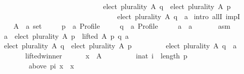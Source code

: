 \begin{isabellebody}
\ \ \ \ \ \ \ \ \ \ \ \ \ \ \ \ \ \ \ \ \ \ \ \ \ \ \ \ \ \ \ \ {\isacharparenleft}{\kern0pt}elect\ plurality\ A\ q\ {\isacharequal}{\kern0pt}\ elect\ plurality\ A\ p\ {\isasymor}\isanewline
\ \ \ \ \ \ \ \ \ \ \ \ \ \ \ \ \ \ \ \ \ \ \ \ \ \ \ \ \ \ \ \ \ \ \ \ elect\ plurality\ A\ q\ {\isacharequal}{\kern0pt}\ {\isacharbraceleft}{\kern0pt}a{\isacharbraceright}{\kern0pt}{\isacharparenright}{\kern0pt}{\isachardoublequoteclose}\isanewline
%
\isadelimproof
%
\endisadelimproof
%
\isatagproof
{}\isamarkupfalse%
\ {\isacharparenleft}{\kern0pt}intro\ allI\ impI{\isacharparenright}{\kern0pt}\isanewline
\ \ \isamarkupfalse%
\isanewline
\ \ \ \ A\ {\isacharcolon}{\kern0pt}{\isacharcolon}{\kern0pt}\ {\isachardoublequoteopen}{\isacharprime}{\kern0pt}a\ set{\isachardoublequoteclose}\ \isanewline
\ \ \ \ p\ {\isacharcolon}{\kern0pt}{\isacharcolon}{\kern0pt}\ {\isachardoublequoteopen}{\isacharprime}{\kern0pt}a\ Profile{\isachardoublequoteclose}\ \isanewline
\ \ \ \ q\ {\isacharcolon}{\kern0pt}{\isacharcolon}{\kern0pt}\ {\isachardoublequoteopen}{\isacharprime}{\kern0pt}a\ Profile{\isachardoublequoteclose}\ \isanewline
\ \ \ \ a\ {\isacharcolon}{\kern0pt}{\isacharcolon}{\kern0pt}\ {\isachardoublequoteopen}{\isacharprime}{\kern0pt}a{\isachardoublequoteclose}\isanewline
\ \ \isamarkupfalse%
\isanewline
\ \ \ \ asm{}{\isacharcolon}{\kern0pt}\isanewline
\ \ \ \ {\isachardoublequoteopen}a\ {\isasymin}\ elect\ plurality\ A\ p\ {\isasymand}\ lifted\ A\ p\ q\ a{\isachardoublequoteclose}\isanewline
\ \ \isamarkupfalse%
\isanewline
\ \ \ \ {\isachardoublequoteopen}elect\ plurality\ A\ q\ {\isacharequal}{\kern0pt}\ elect\ plurality\ A\ p\ {\isasymor}\isanewline
\ \ \ \ \ \ \ \ elect\ plurality\ A\ q\ {\isacharequal}{\kern0pt}\ {\isacharbraceleft}{\kern0pt}a{\isacharbraceright}{\kern0pt}{\isachardoublequoteclose}\isanewline
\ \ \isamarkupfalse%
\ {\isacharminus}{\kern0pt}\isanewline
\ \ \ \ \isamarkupfalse%
\ lifted{\isacharunderscore}{\kern0pt}winner{\isacharcolon}{\kern0pt}\isanewline
\ \ \ \ \ \ {\isachardoublequoteopen}{\isasymforall}x\ {\isasymin}\ A{\isachardot}{\kern0pt}\isanewline
\ \ \ \ \ \ \ \ \ {\isasymforall}i{\isacharcolon}{\kern0pt}{\isacharcolon}{\kern0pt}nat{\isachardot}{\kern0pt}\ i\ {\isacharless}{\kern0pt}\ length\ p\ {\isasymlongrightarrow}\isanewline
\ \ \ \ \ \ \ \ \ \ \ {\isacharparenleft}{\kern0pt}above\ {\isacharparenleft}{\kern0pt}p{\isacharbang}{\kern0pt}i{\isacharparenright}{\kern0pt}\ x\ {\isacharequal}{\kern0pt}\ {\isacharbraceleft}{\kern0pt}x{\isacharbraceright}{\kern0pt}\ {\isasymlongrightarrow}\isanewline

\end{isabellebody}
